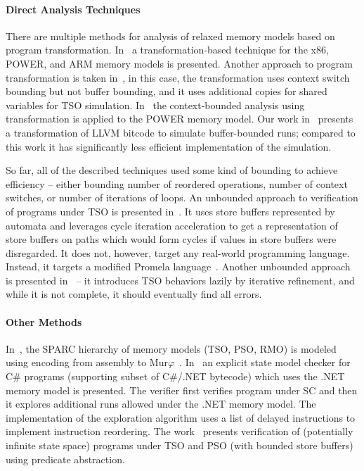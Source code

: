 \paragraph{Direct Analysis Techniques}

There are multiple methods for analysis of relaxed memory models based on program transformation.
In~\cite{Alglave2013} a transformation-based technique for the x86, POWER, and ARM memory models is presented.
Another approach to program transformation is taken in~\cite{Atig2011}, in this case, the transformation uses context switch bounding but not buffer bounding, and it uses additional copies for shared variables for TSO simulation.
In~\cite{Abdulla2017} the context-bounded analysis using transformation is applied to the POWER memory model.
Our work in~\cite{SRB15weakmem} presents a transformation of LLVM bitcode to simulate buffer-bounded \xtso runs; compared to this work it has significantly less efficient implementation of the \xtso simulation.


So far, all of the described techniques used some kind of bounding to achieve efficiency -- either bounding number of reordered operations, number of context switches, or number of iterations of loops.
An unbounded approach to verification of programs under TSO is presented in~\cite{Linden2010}.
It uses store buffers represented by automata and leverages cycle iteration acceleration to get a representation of store buffers on paths which would form cycles if values in store buffers were disregarded.
It does not, however, target any real-world programming language.
Instead, it targets a modified Promela language~\cite{Holzmann1997}.
Another unbounded approach is presented in~\cite{Bouajjani2015} -- it introduces TSO behaviors lazily by iterative refinement, and while it is not complete, it should eventually find all errors.

\paragraph{Other Methods}\label{other-methods}

In~\cite{Park1995}, the SPARC hierarchy of memory models (TSO, PSO, RMO) is modeled using encoding from assembly to Mur\(\varphi\)~\cite{Murphi}.
In~\cite{Huynh2006} an explicit state model checker for C\# programs (supporting subset of C\#/.NET bytecode) which uses the .NET memory model is presented.
The verifier first verifies program under SC and then it explores additional runs allowed under the .NET memory model.
The implementation of the exploration algorithm uses a list of delayed instructions to implement instruction reordering.
The work~\cite{Dan2013} presents verification of (potentially infinite state space) programs under TSO and PSO (with bounded store buffers) using predicate abstraction.

